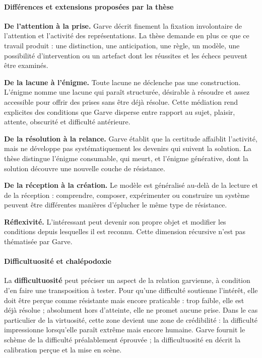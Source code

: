 \documentclass[10pt,a4paper]{article}
\begin{document}
\paragraph{Différences et extensions proposées par la thèse}
\textbf{De l'attention à la prise.} Garve décrit finement la fixation involontaire de l'attention et l'activité des représentations. La thèse demande en plus ce que ce travail produit : une distinction, une anticipation, une règle, un modèle, une possibilité d'intervention ou un artefact dont les réussites et les échecs peuvent être examinés.

\textbf{De la lacune à l'énigme.} Toute lacune ne déclenche pas une construction. L'énigme nomme une lacune qui paraît structurée, désirable à résoudre et assez accessible pour offrir des prises sans être déjà résolue. Cette médiation rend explicites des conditions que Garve disperse entre rapport au sujet, plaisir, attente, obscurité et difficulté antérieure.

\textbf{De la résolution à la relance.} Garve établit que la certitude affaiblit l'activité, mais ne développe pas systématiquement les devenirs qui suivent la solution. La thèse distingue l'énigme consumable, qui meurt, et l'énigme générative, dont la solution découvre une nouvelle couche de résistance.

\textbf{De la réception à la création.} Le modèle est généralisé au-delà de la lecture et de la réception : comprendre, composer, expérimenter ou construire un système peuvent être différentes manières d'éplucher le même type de résistance.

\textbf{Réflexivité.} L'intéressant peut devenir son propre objet et modifier les conditions depuis lesquelles il est reconnu. Cette dimension récursive n'est pas thématisée par Garve.

\paragraph{Difficultuosité et chalépodoxie}
La \textbf{difficultuosité} peut préciser un aspect de la relation garvienne, à condition d'en faire une transposition à tester. Pour qu'une difficulté soutienne l'intérêt, elle doit être perçue comme résistante mais encore praticable : trop faible, elle est déjà résolue ; absolument hors d'atteinte, elle ne promet aucune prise. Dans le cas particulier de la virtuosité, cette zone devient une zone de crédibilité : la difficulté impressionne lorsqu'elle paraît extrême mais encore humaine. Garve fournit le schème de la difficulté préalablement éprouvée ; la difficultuosité en décrit la calibration perçue et la mise en scène.
\end{document}
